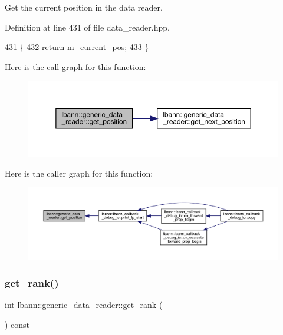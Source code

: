 Get the current position in the data reader. 



Definition at line 431 of file data\+\_\+reader.\+hpp.


\begin{DoxyCode}
431                            \{
432     \textcolor{keywordflow}{return} \hyperlink{classlbann_1_1generic__data__reader_a2facf4e410099ac8c1fa586e797ec2e0}{m\_current\_pos};
433   \}
\end{DoxyCode}
Here is the call graph for this function\+:\nopagebreak
\begin{figure}[H]
\begin{center}
\leavevmode
\includegraphics[width=350pt]{classlbann_1_1generic__data__reader_aa6e4e7a49d30502a0c60c39720ac2499_cgraph}
\end{center}
\end{figure}
Here is the caller graph for this function\+:\nopagebreak
\begin{figure}[H]
\begin{center}
\leavevmode
\includegraphics[width=350pt]{classlbann_1_1generic__data__reader_aa6e4e7a49d30502a0c60c39720ac2499_icgraph}
\end{center}
\end{figure}
\mbox{\label{classlbann_1_1generic__data__reader_ab5321bd7c6e83845785753366e6d9e64}} 
\subsubsection{\texorpdfstring{get\+\_\+rank()}{get\_rank()}}
{\footnotesize\ttfamily int lbann\+::generic\+\_\+data\+\_\+reader\+::get\+\_\+rank (\begin{DoxyParamCaption}{ }\end{DoxyParamCaption}) const\hspace{0.3cm}{\ttfamily [inline]}}



